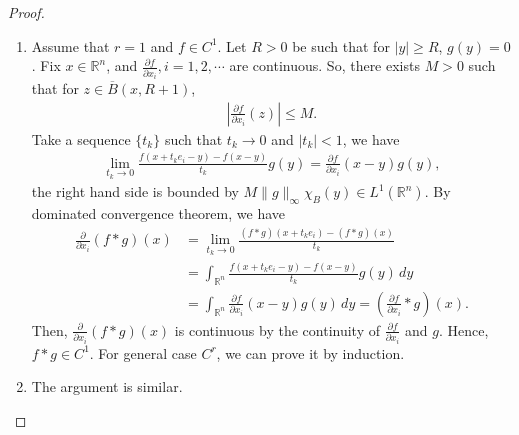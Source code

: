 \documentclass[11pt]{book}
\theoremstyle{definition}
\numberwithin{equation}{chapter}
\begin{document}
\begin{proof}
\begin{enumerate}[label=(\alph*)]
    \item Assume that $r = 1$ and $f \in C^1$. Let $R > 0$ be such that for $\left|y\right| \geq R$, $g(y) = 0$. Fix $x \in \mathbb{R}^n$, and $\frac{\partial f}{\partial x_i}, i = 1,2,\cdots$ are continuous. So, there exists $M > 0$ such that for $z \in \overline{B}(x, R+1)$,
    \begin{align*}
        \left|\frac{\partial f}{\partial x_i}(z)\right| \leq M.
    \end{align*}
    Take a sequence $\{t_k\}$ such that $t_k \to 0$ and $\left|t_k\right| < 1$, we have 
    \begin{align*}
        \lim_{t_k\to 0}\frac{f(x+t_ke_i-y) - f(x-y)}{t_k} g(y) = \frac{\partial f}{\partial x_i}(x-y)g(y),
    \end{align*}
    the right hand side is bounded by $M\|g\|_{\infty} \chi_{B}(y) \in L^1(\mathbb{R}^n)$. By dominated convergence theorem, we have
    \begin{align*}
        \frac{\partial}{\partial x_i} (f*g)(x) & = \lim_{t_k\to 0} \frac{(f*g)(x+t_ke_i) - (f*g)(x)}{t_k} \\
        & = \int_{\mathbb{R}^n} \frac{f(x+t_ke_i-y) - f(x-y)}{t_k}g(y) \,dy \\
        & = \int_{\mathbb{R}^n} \frac{\partial f}{\partial x_i}(x-y)g(y) \,dy = \left(\frac{\partial f}{\partial x_i}*g\right)(x).
    \end{align*}
    Then, $\frac{\partial}{\partial x_i} (f*g)(x)$ is continuous by the continuity of $\frac{\partial f}{\partial x_i}$ and $g$. Hence, $f*g \in C^1$. For general case $C^r$, we can prove it by induction.
    
    \item The argument is similar.
\end{enumerate}
\end{proof}

\medskip
\end{document}
